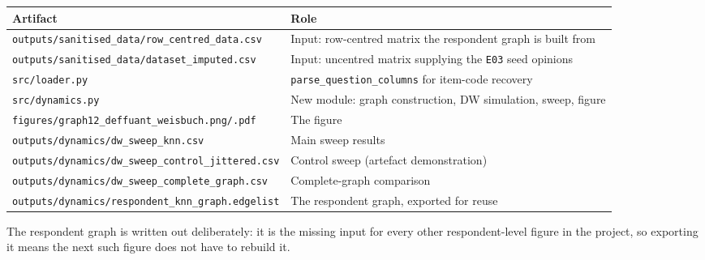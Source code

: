 \documentclass[11pt]{article}
\begin{document}
\begin{center}
\begin{tabularx}{\linewidth}{l Y}
\toprule
Artifact & Role \\
\midrule
\texttt{outputs/sanitised\_data/row\_centred\_data.csv} & Input: row-centred matrix the respondent graph is built from \\
\texttt{outputs/sanitised\_data/dataset\_imputed.csv} & Input: uncentred matrix supplying the \texttt{E03} seed opinions \\
\texttt{src/loader.py} & \texttt{parse\_question\_columns} for item-code recovery \\
\texttt{src/dynamics.py} & New module: graph construction, DW simulation, sweep, figure \\
\texttt{figures/graph12\_deffuant\_weisbuch.png/.pdf} & The figure \\
\texttt{outputs/dynamics/dw\_sweep\_knn.csv} & Main sweep results \\
\texttt{outputs/dynamics/dw\_sweep\_control\_jittered.csv} & Control sweep (artefact demonstration) \\
\texttt{outputs/dynamics/dw\_sweep\_complete\_graph.csv} & Complete-graph comparison \\
\texttt{outputs/dynamics/respondent\_knn\_graph.edgelist} & The respondent graph, exported for reuse \\
\bottomrule
\end{tabularx}
\end{center}

The respondent graph is written out deliberately: it is the missing input for
every other respondent-level figure in the project, so exporting it means the
next such figure does not have to rebuild it.
\end{document}

